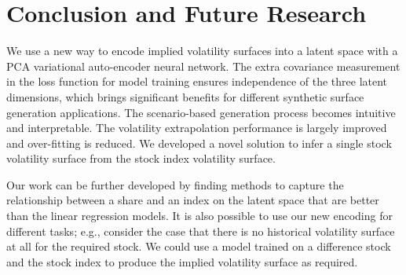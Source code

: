 \documentclass[format=sigconf]{acmart}
\begin{document}
\section{Conclusion and Future Research}
\label{sec:conclusion}
We use a new way to encode implied volatility surfaces into a latent space with a PCA variational auto-encoder neural network. The extra covariance measurement in the loss function for model training ensures independence of the three latent dimensions, which brings significant benefits for different synthetic surface generation applications. The scenario-based generation process becomes intuitive and interpretable. The volatility extrapolation performance is largely improved and over-fitting is reduced. We developed a novel solution to infer a single stock volatility surface from the stock index volatility surface.   

Our work can be further developed by finding methods to capture the relationship between a share and an index on the latent space that are better than the linear regression models. It is also possible to use our new encoding for different tasks; e.g., consider the case that there is no historical volatility surface at all for the required stock. We could use a model trained on a difference stock and the stock index to produce the implied volatility surface as required. 



\end{document}
